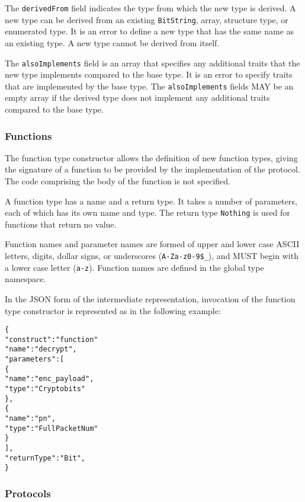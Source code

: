 \documentclass[10pt,twocolumn,a4paper]{article}
\newcommand{\code}[1]{\texttt{#1}}
\begin{document}
The \code{derivedFrom} field indicates the type from which the new type is
derived.  A new type can be derived from an existing \code{BitString},
array, structure type, or enumerated type. It is an error to define a new
type that has the same name as an existing type. A new type cannot be
derived from itself.

The \code{alsoImplements} field is an array that specifies any additional
traits that the new type implements compared to the base type. It is an
error to specify traits that are implemented by the base type.
The \code{alsoImplements} fields MAY be an empty array if the derived type
does not implement any additional traits compared to the base type.

\subsubsection{Functions}
\label{sec:functions}

The function type constructor allows the definition of new function types,
giving the signature of a function to be provided by the implementation of
the protocol. The code comprising the body of the function is not specified. 

A function type has a name and a return type. It takes a number of
parameters, each of which has its own name and type. The return type
\code{Nothing} is used for functions that return no value.

Function names and parameter names are formed of upper and lower case ASCII
letters, digits, dollar signs, or underscores (\code{A-Za-z0-9\$\_}), and
MUST begin with a lower case letter (\code{a-z}).
Function names are defined in the global type namespace.

In the JSON form of the intermediate representation, invocation of the
function type constructor is represented as in the following example:
\footnotesize
\begin{alltt}
  \{
    "construct"   : "function"
    "name"        : "decrypt",
    "parameters"  : [
      \{
        "name" : "enc\_payload",
        "type" : "Cryptobits"
      \},
      \{
        "name" : "pn",
        "type" : "FullPacketNum"
      \}
    ],
    "returnType"  : "Bit",
  \}
\end{alltt}
\normalsize

\subsubsection{Protocols}
\end{document}
